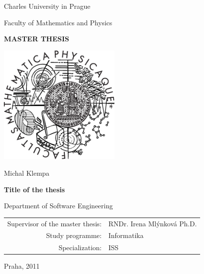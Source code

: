 \documentclass[a4paper,12pt,oneside]{report}
\def\mfauthor{Michal Klempa}
\def\mfadvisor{RNDr. Irena Mlýnková Ph.D.}
\def\mfplacedate{Praha, 2011}
\begin{document}

\pagestyle{empty}
\begin{center}

\large

Charles University in Prague

\medskip

Faculty of Mathematics and Physics

\vfill

{\bf\Large MASTER THESIS}

\vfill

\centerline{\mbox{\includegraphics[width=60mm]{logo.eps}}}

\vfill
\vspace{5mm}

{\LARGE \mfauthor}

\vspace{15mm}

{\LARGE\bfseries Title of the thesis}

\vfill

Department of Software Engineering

\vfill

\begin{tabular}{rl}

Supervisor of the master thesis: & 	\mfadvisor \\
\noalign{\vspace{2mm}}
Study programme: & Informatika \\
\noalign{\vspace{2mm}}
Specialization: & ISS \\
\end{tabular}

\vfill

\mfplacedate

\end{center}
\end{document}
